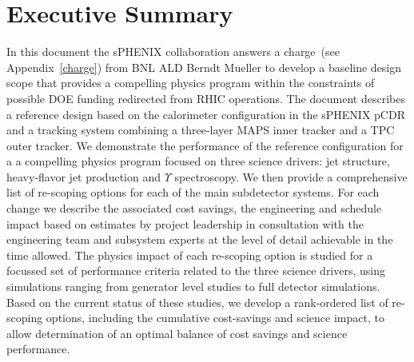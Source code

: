 \section*{Executive Summary}
\label{executive_summary}
\setcounter{page}{1}

\nocite{*}

In this document the sPHENIX collaboration answers a charge~(see
Appendix~\ref{charge}) from BNL ALD Berndt Mueller to develop a
baseline design scope that provides a compelling physics program
within the constraints of possible DOE funding redirected from RHIC
operations. The document describes a reference design based on the
calorimeter configuration in the sPHENIX pCDR and a tracking system
combining a three-layer MAPS inner tracker and a TPC outer tracker. We
demonstrate the performance of the reference configuration for a a
compelling physics program focused on three science drivers: jet
structure, heavy-flavor jet production and $\Upsilon$ spectroscopy.
We then provide a comprehensive list of re-scoping options for each of
the main subdetector systems. For each change we describe the
associated cost savings, the engineering and schedule impact based on
estimates by project leadership in consultation with the engineering
team and subsystem experts at the level of detail achievable in the
time allowed.  The physics impact of each re-scoping option is studied
for a focussed set of performance criteria related to the three
science drivers, using simulations ranging from generator level
studies to full detector simulations. Based on the current status of
these studies, we develop a rank-ordered list of re-scoping options,
including the cumulative cost-savings and science impact, to allow
determination of an optimal balance of cost savings and science
performance.

